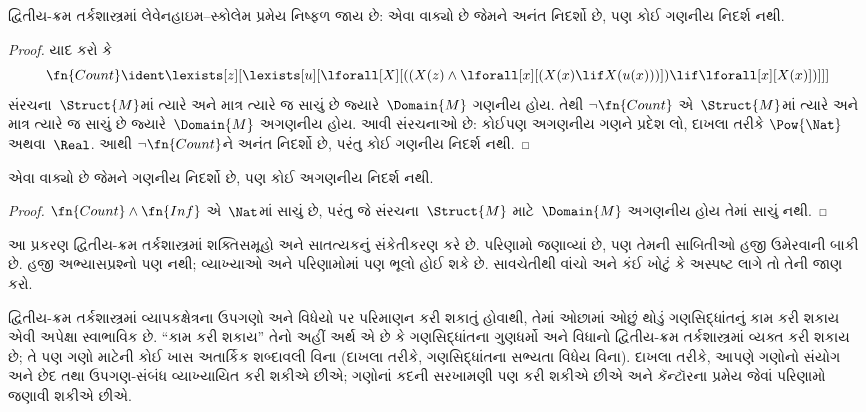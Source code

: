 \begin{thm}
 દ્વિતીય-ક્રમ તર્કશાસ્ત્રમાં લેવેનહાઇમ--સ્કોલેમ
પ્રમેય નિષ્ફળ જાય છે: એવા વાક્યો છે જેમને અનંત નિદર્શો છે,
પણ કોઈ ગણનીય નિદર્શ નથી.
\end{thm}

\begin{proof}
યાદ કરો કે
\[
\fn{Count} \ident \lexists[z][\lexists[u][\lforall[X][((X(z) \land
      \lforall[x][(X(x) \lif X(u(x)))]) \lif \lforall[x][X(x)])]]]
\]
સંરચના~$\Struct{M}$માં ત્યારે અને માત્ર ત્યારે જ સાચું છે
જ્યારે~$\Domain{M}$ ગણનીય હોય. તેથી
$\lnot\fn{Count}$ એ~$\Struct{M}$માં ત્યારે અને માત્ર ત્યારે જ
સાચું છે જ્યારે~$\Domain{M}$ અગણનીય હોય. આવી
સંરચનાઓ છે: કોઈપણ અગણનીય ગણને પ્રદેશ લો,
દાખલા તરીકે $\Pow{\Nat}$ અથવા~$\Real$. આથી
$\lnot \fn{Count}$ને અનંત નિદર્શો છે, પરંતુ કોઈ
ગણનીય નિદર્શ નથી.
\end{proof}

\begin{thm}
એવા વાક્યો છે જેમને ગણનીય નિદર્શો છે,
પણ કોઈ અગણનીય નિદર્શ નથી.
\end{thm}

\begin{proof}
$\fn{Count} \land \fn{Inf}$ એ~$\Nat$માં સાચું છે, પરંતુ
જે સંરચના~$\Struct{M}$ માટે~$\Domain{M}$
અગણનીય હોય તેમાં સાચું નથી.
\end{proof}
\endgroup


\OLEndChapterHook
\endgroup


\begingroup
\makeatletter{}\makeatother

\label{guunit:OLP-0336}


\begin{editorial}
આ પ્રકરણ દ્વિતીય-ક્રમ તર્કશાસ્ત્રમાં શક્તિસમૂહો અને સાતત્યકનું
સંકેતીકરણ કરે છે. પરિણામો જણાવ્યાં છે, પણ તેમની સાબિતીઓ હજી
ઉમેરવાની બાકી છે. હજી અભ્યાસપ્રશ્નો પણ નથી; વ્યાખ્યાઓ અને પરિણામોમાં
પણ ભૂલો હોઈ શકે છે. સાવચેતીથી વાંચો અને કંઈ ખોટું કે અસ્પષ્ટ લાગે
તો તેની જાણ કરો.
\end{editorial}

\begingroup
\makeatletter{}\makeatother


\label{guunit:OLP-0337}


દ્વિતીય-ક્રમ તર્કશાસ્ત્રમાં વ્યાપકક્ષેત્રના ઉપગણો અને વિધેયો પર
પરિમાણન કરી શકાતું હોવાથી, તેમાં ઓછામાં ઓછું થોડું ગણસિદ્ધાંતનું
કામ કરી શકાય એવી અપેક્ષા સ્વાભાવિક છે. ``કામ કરી શકાય'' તેનો અહીં
અર્થ એ છે કે ગણસિદ્ધાંતના ગુણધર્મો અને વિધાનો દ્વિતીય-ક્રમ
તર્કશાસ્ત્રમાં વ્યક્ત કરી શકાય છે; તે પણ ગણો માટેની કોઈ ખાસ
અતાર્કિક શબ્દાવલી વિના (દાખલા તરીકે, ગણસિદ્ધાંતના સભ્યતા
વિધેય વિના). દાખલા તરીકે, આપણે ગણોનો સંયોગ અને છેદ તથા
ઉપગણ-સંબંધ વ્યાખ્યાયિત કરી શકીએ છીએ; ગણોનાં કદની સરખામણી પણ કરી
શકીએ છીએ અને કૅન્ટૉરના પ્રમેય જેવાં પરિણામો જણાવી શકીએ છીએ.
\endgroup


